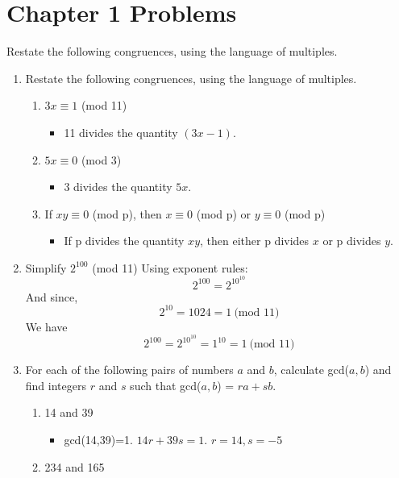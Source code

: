 \documentclass[12pt]{article}
\title{\scalebox{2}{Math 431 Homework 1}}
\author{\scalebox{1.5}{Theo Koss}}
\date{September 2020}
\begin{document}
\maketitle
\section{Chapter 1 Problems}
Restate the following congruences, using the language of multiples.
\begin{enumerate}
    \item Restate the following congruences, using the language of multiples.
    \begin{enumerate}
        \item $3x \equiv 1$ (mod 11)
        \begin{itemize}
            \item 11 divides the quantity $(3x-1)$.
        \end{itemize}
        \item $5x \equiv 0$ (mod 3)
                \begin{itemize}
            \item 3 divides the quantity $5x$.
        \end{itemize}
        \item If $xy \equiv 0$ (mod p), then $x \equiv 0$ (mod p) or $y \equiv 0$ (mod p)
        \begin{itemize}
            \item If p divides the quantity $xy$, then either p divides $x$ or p divides $y$.
        \end{itemize}
    \end{enumerate}
    \item Simplify $2^{100}$ (mod 11) \newline Using exponent rules: $$2^{100}=2^{10^{10}}$$And since, $$2^{10}=1024=1\  \text{(mod 11)}$$We have$$2^{100}=2^{10^{10}}=1^{10}=1\  \text{(mod 11)}$$
    \newpage \item For each of the following pairs of numbers $a$ and $b$, calculate gcd($a,b$) and find integers $r$ and $s$ such that gcd($a, b$) = $ra + sb$.
    \begin{enumerate}
        \item 14 and 39 
            \begin{itemize}
                \item gcd(14,39)=1. $14r+39s=1$. $r=14, s=-5$
            \end{itemize}
        \item 234 and 165

\end{enumerate}
\end{enumerate}
\end{document}
